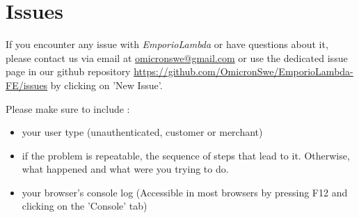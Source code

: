 \section{Issues}
If you encounter any issue with \textit{EmporioLambda} or have questions about it, please contact us via email at \href{mailto:omicronswe@gmail.com}{omicronswe@gmail.com} or use the dedicated issue page in our github repository \url{https://github.com/OmicronSwe/EmporioLambda-FE/issues} by clicking on 'New Issue'. 

Please make sure to include :
\begin{itemize}
\item your user type (unauthenticated, customer or merchant)
\item if the problem is repeatable, the sequence of steps that lead to it. Otherwise, what happened and what were you trying to do.
\item your browser's console log (Accessible in most browsers by pressing F12 and clicking on the 'Console' tab)
\end{itemize}